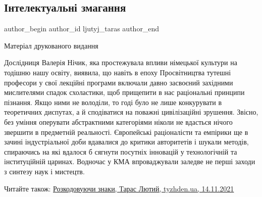  
 
 
 
 
\subsection{Інтелектуальні змагання}

\ifcmt
 author_begin
   author_id ljutyj_taras
 author_end
\fi

Матеріал друкованого видання 


Дослідниця Валерія Нічик, яка простежувала впливи німецької культури на тодішню
нашу освіту, виявила, що навіть в епоху Просвітництва тутешні професори у свої
лекційні програми включали давно засвоєний західними мислителями спадок
схоластики, щоб прищепити в нас раціональні принципи пізнання. Якщо ними не
володіли, то годі було не лише конкурувати в теоретичних диспутах, а й
сподіватися на поважні цивілізаційні зрушення. Звісно, без уміння оперувати
абстракт­ними категоріями ніколи не вдасться нічого звершити в предметній
реальності. Європейські раціоналісти та емпірики ще в зачині індустріальної
доби вдавалися до критики авторитетів і шукали методів, спираючись на які
вдалося б сягнути посутніх інновацій у технологічній та інституційній царинах.
Водночас у КМА впроваджували заледве не перші заходи з синтезу наук і мистецтв.

Читайте також: \href{https://tyzhden.ua/Columns/50/253612}{Розкодовуючи знаки, %
Тарас Лютий, tyzhden.ua, 14.11.2021}

